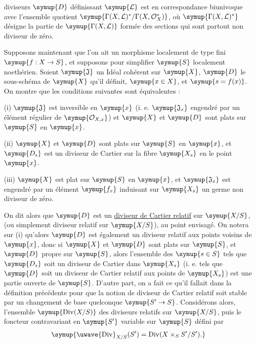 diviseurs $\symup{D}$ définissant $\symup{\mathcal L}$ est en correspondance biunivoque avec
l'ensemble quotient $\symup{\Gamma(X,\mathcal L)^*/\Gamma(X,\mathcal O_X^*)}$, où $\symup{\Gamma(X,\mathcal L)^*}$ désigne la partie de $\symup{\Gamma(X,\mathcal L)}$ formée
des sections qui sont partout non diviseur de zéro.

Supposons maintenant que l'on ait un morphisme localement de type fini
$\symup{f:X\to S}$, et supposons pour simplifier $\symup{S}$ localement noethérien.
Soient $\symup{\mathfrak J}$ un Idéal cohérent sur $\symup{X}$, $\symup{D}$ le sous-schéma de $\symup{X}$ qu'il
définit, $\symup{x\in X}$, et $\symup{s=f(x)}$. On montre que les conditions suivantes sont
équivalentes :

\noindent (i) $\symup{\mathfrak J}$ est inversible en $\symup{x}$ (i. e. $\symup{\mathfrak J_x}$ engendré
par un élément régulier de $\symup{\mathcal O_{X,x}}$) et $\symup{X}$ et $\symup{D}$ sont plats sur $\symup{S}$ en $\symup{x}$.

\noindent (ii) $\symup{X}$ et $\symup{D}$ sont plats sur $\symup{S}$ en $\symup{x}$, et $\symup{D_s}$ est un diviseur
de Cartier sur la fibre $\symup{X_s}$ en le point $\symup{x}$.

\noindent (iii) $\symup{X}$ est plat sur $\symup{S}$ en $\symup{x}$, et $\symup{\mathfrak J_x}$ est engendré par
un élément $\symup{f_x}$ induisant sur $\symup{X_s}$ un germe non diviseur de zéro.

On dit alors que $\symup{D}$ est un \uline{diviseur de Cartier relatif} sur $\symup{X/S}$, (ou
simplement diviseur relatif sur $\symup{X/S}$), au point envisagé. On notera sur (i)
qu'alors $\symup{D}$ est également un diviseur relatif aux points voisins de $\symup{x}$, donc
si $\symup{X}$ et $\symup{D}$ sont plats sur $\symup{S}$, et $\symup{D}$ propre sur $\symup{S}$, alors l'ensemble des
$\symup{s\in S}$ tels que $\symup{D_s}$ soit un diviseur de Cartier dans $\symup{X_s}$ (i. e. tels que
$\symup{D}$ soit un diviseur de Cartier relatif aux points de $\symup{X_s}$) est une partie
ouverte de $\symup{S}$. D'autre part, on a fait ce qu'il fallait dans la définition
précédente pour que la notion de diviseur de Cartier relatif soit stable par
un changement de base quelconque $\symup{S'\to S}$. Considérons alors,
l'ensemble $\symup{\operatorname{Div}(X/S)}$ des diviseurs relatifs sur $\symup{X/S}$, puis le
foncteur contravariant en $\symup{S'}$ variable sur $\symup{S}$ défini par
\[
\symup{\text{\uwave{Div}}_{X/S}(S')=
\operatorname{Div}(X\times_SS'/S').}
\]

